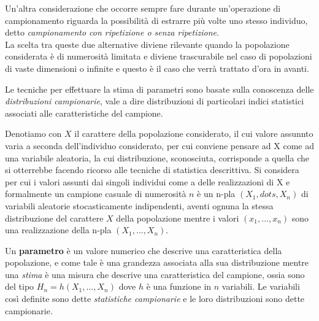 \documentclass[a4paper,12pt, oneside]{book}
\begin{document}
Un’altra considerazione che occorre sempre fare durante un’operazione di
campionamento riguarda la possibilità di estrarre più volte uno stesso individuo,
detto \textit{campionamento con ripetizione o senza ripetizione}.\\
La scelta tra queste due alternative diviene rilevante quando la popolazione
considerata è di numerosità limitata e diviene trascurabile nel caso di popolazioni di
vaste dimensioni o infinite e questo è il caso che verrà trattato d’ora in avanti.

Le tecniche per effettuare la stima di parametri sono basate sulla conoscenza delle \emph{distribuzioni campionarie}, 
vale a dire distribuzioni di particolari indici statistici associati alle caratteristiche del campione.

Denotiamo con $X$ il carattere della popolazione considerato, il cui valore assunnto varia a seconda 
dell'individuo considerato, per cui conviene pensare ad X come ad una variabile aleatoria, la cui distribuzione,
sconosciuta, corrisponde a quella che si otterrebbe facendo ricorso alle tecniche di statistica descrittiva.\newline
Si considera per cui i valori assunti dai singoli individui come a delle realizzazioni di X e formalmente un campione
casuale di numerosità $n$ è un n-pla $(X_1, dots, X_n)$ di variabili aleatorie stocasticamente indipendenti,
aventi ognuna la stessa distribuzione del carattere $X$ della popolazione mentre i valori $(x_1, \dots, x_n)$
sono una realizzazione della n-pla $(X_1, \dots, X_n)$.

Un \textbf{parametro} è un valore numerico che descrive una caratteristica della popolazione, 
e come tale è una grandezza associata alla sua distribuzione mentre una \emph{stima} è una misura che descrive
una caratteristica del campione, ossia sono del tipo $H_n = h(X_1, \dots, X_n)$ dove $h$ è una funzione in $n$ variabili.\newline
Le variabili così definite sono dette \emph{statistiche campionarie} e le loro distribuzioni sono dette campionarie.
\end{document}
